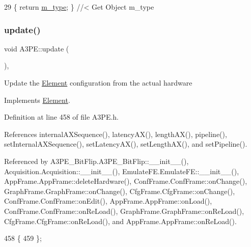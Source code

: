 \begin{DoxyCode}
29 \{ \textcolor{keywordflow}{return} \hyperlink{classObject_a457a600fe8c00eb1034374f75110a78c}{m\_type};       \} \textcolor{comment}{//< Get Object m\_type}
\end{DoxyCode}
\mbox{\label{classA3PE_a9e9b5ba5bd0ee19470c80761269a00f6}} 
\subsubsection{\texorpdfstring{update()}{update()}}
{\footnotesize\ttfamily void A3\+P\+E\+::update (\begin{DoxyParamCaption}{ }\end{DoxyParamCaption})\hspace{0.3cm}{\ttfamily [inline]}, {\ttfamily [virtual]}}

Update the \hyperlink{classElement}{Element} configuration from the actual hardware 

Implements \hyperlink{classElement_a4e6c83efae95616ebddd03c793a26661}{Element}.



Definition at line 458 of file A3\+P\+E.\+h.



References internal\+A\+X\+Sequence(), latency\+A\+X(), length\+A\+X(), pipeline(), set\+Internal\+A\+X\+Sequence(), set\+Latency\+A\+X(), set\+Length\+A\+X(), and set\+Pipeline().



Referenced by A3\+P\+E\+\_\+\+Bit\+Flip.\+A3\+P\+E\+\_\+\+Bit\+Flip\+::\+\_\+\+\_\+init\+\_\+\+\_\+(), Acquisition.\+Acquisition\+::\+\_\+\+\_\+init\+\_\+\+\_\+(), Emulate\+F\+E.\+Emulate\+F\+E\+::\+\_\+\+\_\+init\+\_\+\+\_\+(), App\+Frame.\+App\+Frame\+::delete\+Hardware(), Conf\+Frame.\+Conf\+Frame\+::on\+Change(), Graph\+Frame.\+Graph\+Frame\+::on\+Change(), Cfg\+Frame.\+Cfg\+Frame\+::on\+Change(), Conf\+Frame.\+Conf\+Frame\+::on\+Edit(), App\+Frame.\+App\+Frame\+::on\+Load(), Conf\+Frame.\+Conf\+Frame\+::on\+Re\+Load(), Graph\+Frame.\+Graph\+Frame\+::on\+Re\+Load(), Cfg\+Frame.\+Cfg\+Frame\+::on\+Re\+Load(), and App\+Frame.\+App\+Frame\+::on\+Re\+Load().


\begin{DoxyCode}
458                  \{
459   \};
\end{DoxyCode}
\mbox{\label{classObject_a83d2db2df682907ea1115ad721c1c4a1}} 
